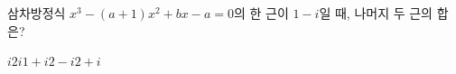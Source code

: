 삼차방정식 $x^3-(a+1)x^2+bx-a=0$의 한 근이 $1-i$일 때, 나머지 두 근의 합은? 
\begin{choices32}{$i$}{$2i$}{$1+i$}{$2-i$}{$2+i$}\end{choices32}
